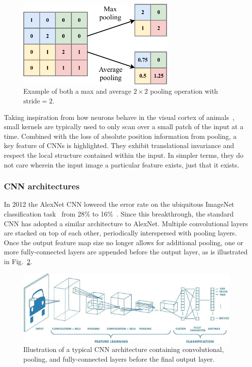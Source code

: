 \begin{figure} %
    \includegraphics[width=0.7\textwidth]{diagrams/6-cnn/pooling.pdf}
    \caption[Example of pooling operation]
    {Example of both a max and average $2 \times 2$ pooling operation with $\text{stride}=2$.}
    \label{fig:pooling}
\end{figure}

Taking inspiration from how neurons behave in the visual cortex of animals~\cite{lecun2015}, small
kernels are typically used to only scan over a small patch of the input at a time. Combined with
the loss of absolute position information from pooling, a key feature of CNNs is highlighted. They
exhibit translational invariance and respect the local structure contained within the input. In
simpler terms, they do not care wherein the input image a particular feature exists, just that it
exists.

\subsubsection*{CNN architectures} %

In 2012 the AlexNet CNN lowered the error rate on the ubiquitous ImageNet classification
task~\cite{deng2009} from 28\% to 16\%~\cite{krizhevsky2012}. Since this breakthrough, the
standard CNN has adopted a similar architecture to AlexNet. Multiple convolutional layers are
stacked on top of each other, periodically interspersed with pooling layers. Once the output
feature map size no longer allows for additional pooling, one or more fully-connected layers are
appended before the output layer, as is illustrated in Fig.~\ref{fig:conv_diagram}.

\begin{figure} %
    \includegraphics[width=\textwidth]{diagrams/6-cnn/conv_diagram.pdf}
    \caption[Illustration of a typical Convolutional Neural Network architecture]
    {Illustration of a typical CNN architecture containing convolutional, pooling, and
        fully-connected layers before the final output layer.}
    \label{fig:conv_diagram}
\end{figure}

